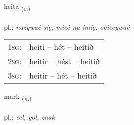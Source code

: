 \documentclass[frontgrid, backgrid]{flacards}\usepackage[]{graphicx}\usepackage[]{xcolor}
\begin{document}
\renewcommand{\flhead}{\vskip5pt \fboxsep=0pt {\small\bfseries\footnotesize Sagnorð | Verb}}
\renewcommand{\fcfoot}{\vskip5pt \fboxsep=0pt \hspace{2pt}{\small\bfseries\footnotesize 1K}}

\renewcommand{\blhead}{\vskip5pt {\small\bfseries\footnotesize Sagnorð | Verb }}
\renewcommand{\bcfoot}{\vskip5pt \hspace{2pt}{\small\bfseries\footnotesize 1K}}


{heita \small{\textsubscript{(\textit{v.})}} \\[1ex] %
\textphonetic{[heiːta]} \\
pl.: \emph{nazywać się, mieć na imię, obiecywać} \\  [2ex]
\renewcommand*{\arraystretch}{0.8}
\begin{tabular}{p{1cm}l}
\textsc{1sg}: & heiti -- hét -- heitið \\ 
\textsc{2sg}: & heitir -- hést -- heitið \\ 
\textsc{3sg}: & heitir -- hét -- heitið \\ 
\end{tabular}
}

\renewcommand{\flhead}{\vskip5pt \fboxsep=0pt {\small\bfseries\footnotesize Nafnorð | Noun}}
\renewcommand{\fcfoot}{\vskip5pt \fboxsep=0pt \hspace{2pt}{\small\bfseries\footnotesize 1K}}

\renewcommand{\blhead}{\vskip5pt {\small\bfseries\footnotesize Nafnorð | Noun }}
\renewcommand{\bcfoot}{\vskip5pt \hspace{2pt}{\small\bfseries\footnotesize 1K}}


{mark \small{\textsubscript{(\textit{n.})}} \\[1ex] %
\textphonetic{[mar̥k]} \\
pl.: \emph{cel, gol, znak} \\  [2ex]
\renewcommand*{\arraystretch}{0.8}
}
\end{document}
